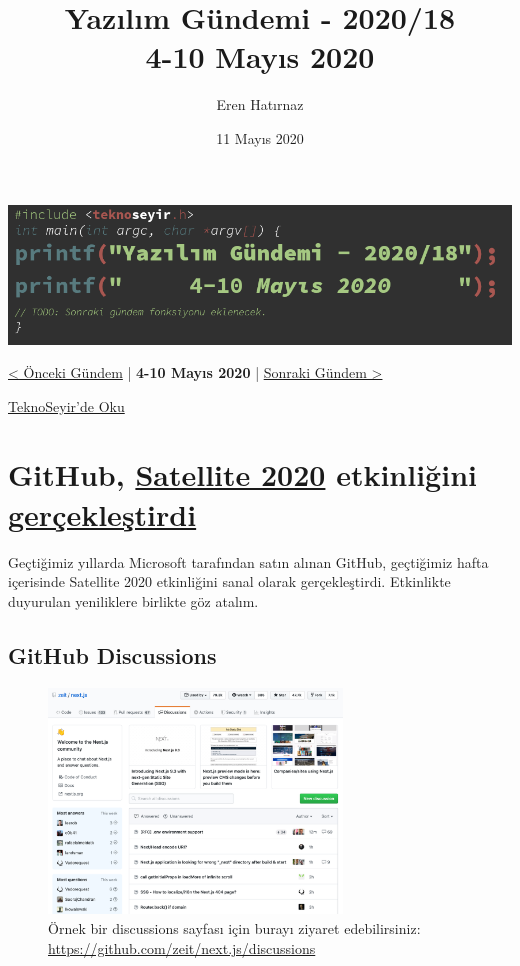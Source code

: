 \documentclass[11pt]{article}
\author{Eren Hatırnaz}
\date{11 Mayıs 2020}
\title{Yazılım Gündemi - 2020/18\\\medskip
\large 4-10 Mayıs 2020}
\begin{document}
\maketitle
\tableofcontents \clearpage\shorthandoff{=}

\begin{center}
\includegraphics[width=.9\linewidth]{gorseller/yazilim-gundemi-banner.png}
\end{center}

\begin{center}
\href{../17/yazilim-gundemi-2020-17.pdf}{< Önceki Gündem} | \textbf{4-10 Mayıs 2020} | \href{../19/yazilim-gundemi-2020-19.pdf}{Sonraki Gündem >}

\href{https://teknoseyir.com/blog/yazilim-gundemi-2020-18}{TeknoSeyir'de Oku}
\end{center}

\section{GitHub, \href{https://githubsatellite.com/}{Satellite 2020} etkinliğini \href{https://github.blog/2020-05-06-new-from-satellite-2020-github-codespaces-github-discussions-securing-code-in-private-repositories-and-more/}{gerçekleştirdi}}
\label{sec:orgfcabb7e}
Geçtiğimiz yıllarda Microsoft tarafından satın alınan GitHub, geçtiğimiz hafta
içerisinde Satellite 2020 etkinliğini sanal olarak gerçekleştirdi. Etkinlikte
duyurulan yeniliklere birlikte göz atalım.

\subsection{GitHub Discussions}
\label{sec:org3c89b07}
\begin{figure}[htbp]
\centering
\includegraphics[height=6cm]{gorseller/github-discussions.png}
\caption[//github.com/zeit/next.js/discussions]{Örnek bir discussions sayfası için burayı ziyaret edebilirsiniz: \url{https://github.com/zeit/next.js/discussions}}
\end{figure}
\end{document}
